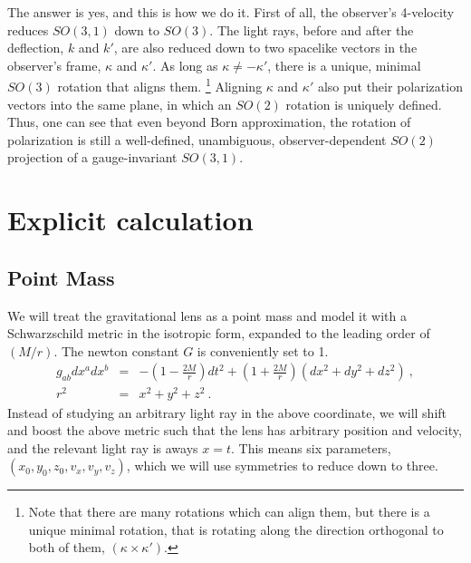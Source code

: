 \documentclass[aps,showpacs,onecolumn,floats,prd,superscriptaddress,nofootinbib]{revtex4}
\begin{document}
The answer is yes, and this is how we do it. 
First of all, the observer's 4-velocity reduces $SO(3,1)$ down to $SO(3)$.
The light rays, before and after the deflection, $k$ and $k'$, are also reduced down to two spacelike vectors in the observer's frame, $\kappa$ and $\kappa'$.
As long as $\kappa\neq-\kappa'$, there is a unique, minimal $SO(3)$ rotation that aligns them.
\footnote{Note that there are many rotations which can align them, but there is a unique minimal rotation, that is rotating along the direction orthogonal to both of them, $(\kappa\times\kappa')$.}
Aligning $\kappa$ and $\kappa'$ also put their polarization vectors into the same plane, in which an $SO(2)$ rotation is uniquely defined. 
Thus, one can see that even beyond Born approximation, the rotation of polarization is still a well-defined, unambiguous, observer-dependent $SO(2)$ projection of a gauge-invariant $SO(3,1)$.

\section{Explicit calculation}
\label{sec-Sch}

\subsection{Point Mass}

We will treat the gravitational lens as a point mass and model it with a Schwarzschild metric in the isotropic form, expanded to the leading order of $(M/r)$. 
The newton constant $G$ is conveniently set to 1.
\begin{eqnarray}
g_{ab}dx^adx^b &=& -\left(1-\frac{2M}{r}\right)dt^2 + \left(1+\frac{2M}{r}\right)\left(dx^2+dy^2+dz^2\right)~, \\
r^2 &=& x^2 + y^2 + z^2~.
\label{eq-SchIso}
\end{eqnarray}
Instead of studying an arbitrary light ray in the above coordinate, we will shift and boost the above metric such that the lens has arbitrary position and velocity, and the relevant light ray is aways $x=t$.
This means six parameters, $(x_0,y_0,z_0,v_x,v_y,v_z)$, which we will use symmetries to reduce down to three.
\end{document}
